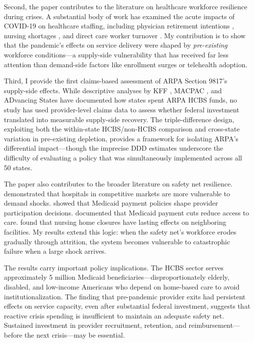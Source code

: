 \documentclass[12pt]{article}
\begin{document}
Second, the paper contributes to the literature on healthcare workforce resilience during crises. A substantial body of work has examined the acute impacts of COVID-19 on healthcare staffing, including physician retirement intentions \citep{sinsky2021covid}, nursing shortages \citep{auerbach2022nurse}, and direct care worker turnover \citep{scales2020hcbs}. My contribution is to show that the pandemic's effects on service delivery were shaped by \emph{pre-existing} workforce conditions---a supply-side vulnerability that has received far less attention than demand-side factors like enrollment surges or telehealth adoption.

Third, I provide the first claims-based assessment of ARPA Section 9817's supply-side effects. While descriptive analyses by KFF \citep{kff2024arpa}, MACPAC \citep{macpac2024arpa}, and ADvancing States \citep{advancingstates2024} have documented how states spent ARPA HCBS funds, no study has used provider-level claims data to assess whether federal investment translated into measurable supply-side recovery. The triple-difference design, exploiting both the within-state HCBS/non-HCBS comparison and cross-state variation in pre-existing depletion, provides a framework for isolating ARPA's differential impact---though the imprecise DDD estimates underscore the difficulty of evaluating a policy that was simultaneously implemented across all 50 states.

The paper also contributes to the broader literature on safety net resilience. \citet{dranove2000} demonstrated that hospitals in competitive markets are more vulnerable to demand shocks. \citet{duggan2000} showed that Medicaid payment policies shape provider participation decisions. \citet{gruber2005} documented that Medicaid payment cuts reduce access to care. \citet{alexander2020} found that nursing home closures have lasting effects on neighboring facilities. My results extend this logic: when the safety net's workforce erodes gradually through attrition, the system becomes vulnerable to catastrophic failure when a large shock arrives.

The results carry important policy implications. The HCBS sector serves approximately 5 million Medicaid beneficiaries---disproportionately elderly, disabled, and low-income Americans who depend on home-based care to avoid institutionalization. The finding that pre-pandemic provider exits had persistent effects on service capacity, even after substantial federal investment, suggests that reactive crisis spending is insufficient to maintain an adequate safety net. Sustained investment in provider recruitment, retention, and reimbursement---before the next crisis---may be essential.
\end{document}
